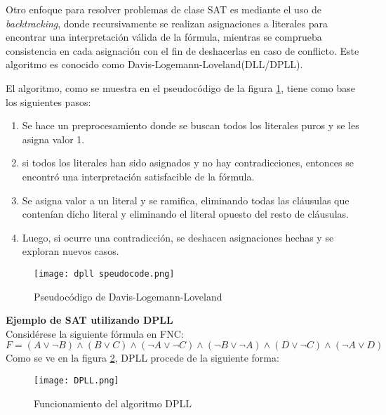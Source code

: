 \documentclass[12pt]{report}
\begin{document}
Otro enfoque para resolver problemas de clase SAT es mediante el uso de \textit{backtracking}, donde recursivamente se realizan asignaciones a literales para encontrar una interpretación válida de la fórmula, mientras se comprueba consistencia en cada asignación con el fin de deshacerlas en caso de conflicto. Este algoritmo es conocido como Davis-Logemann-Loveland(DLL/DPLL).

El algoritmo, como se muestra en el pseudocódigo de la figura \ref{fig:dpll pc}, tiene como base los siguientes pasos:
\begin{enumerate}
    \item Se hace un preprocesamiento donde se buscan todos los literales puros y se les asigna valor 1.
    \item si todos los literales han sido asignados y no hay contradicciones, entonces se encontró una interpretación satisfacible de la fórmula.
    \item Se asigna valor a un literal y se ramifica, eliminando todas las cláusulas que contenían dicho literal y eliminando el literal opuesto del resto de cláusulas.
    \item Luego, si ocurre una contradicción, se deshacen asignaciones hechas y se exploran nuevos casos.\\
\end{enumerate}

\begin{figure}[ht]
    \centering
    \texttt{[image: dpll speudocode.png]}
    \caption{Pseudocódigo de Davis-Logemann-Loveland}
    \label{fig:dpll pc}
\end{figure}

 
\textbf{Ejemplo de SAT utilizando DPLL}\\

Considérese la siguiente fórmula en FNC:
$F=(A\lor \neg B)\land(B\lor C)\land(\neg A\lor \neg C)\land(\neg B\lor \neg A)\land(D\lor \neg C)\land(\neg A\lor D)$\\

Como se ve en la figura \ref{fig:DPLL}, DPLL procede de la siguiente forma:

\begin{figure}[ht]
    \centering
    \texttt{[image: DPLL.png]}
    \caption{Funcionamiento del algoritmo DPLL}
    \label{fig:DPLL}
\end{figure}
\end{document}
